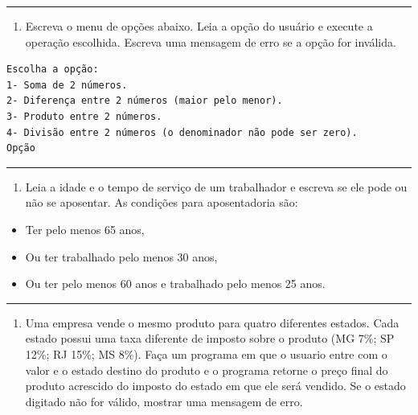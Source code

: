 \documentclass[12pt,a4paper]{article}
\renewcommand{\linethickness}{0.05em}
\providecommand{\tightlist}{%
      \setlength{\itemsep}{0pt}\setlength{\parskip}{0pt}}
\begin{document}
    \begin{center}\rule{0.5\linewidth}{\linethickness}\end{center}

\begin{enumerate}
\def\labelenumi{\arabic{enumi}.}
\setcounter{enumi}{5}
\tightlist
\item
  Escreva o menu de opções abaixo. Leia a opção do usuário e execute a
  operação escolhida. Escreva uma mensagem de erro se a opção for
  inválida.
\end{enumerate}

\begin{verbatim}
Escolha a opção:
1- Soma de 2 números.
2- Diferença entre 2 números (maior pelo menor).
3- Produto entre 2 números.
4- Divisão entre 2 números (o denominador não pode ser zero).
Opção
\end{verbatim}

    \begin{center}\rule{0.5\linewidth}{\linethickness}\end{center}

\begin{enumerate}
\def\labelenumi{\arabic{enumi}.}
\setcounter{enumi}{6}
\tightlist
\item
  Leia a idade e o tempo de serviço de um trabalhador e escreva se ele
  pode ou não se aposentar. As condições para aposentadoria são:
\end{enumerate}

\begin{itemize}
\tightlist
\item
  Ter pelo menos 65 anos,
\item
  Ou ter trabalhado pelo menos 30 anos,
\item
  Ou ter pelo menos 60 anos e trabalhado pelo menos 25 anos.
\end{itemize}

    \begin{center}\rule{0.5\linewidth}{\linethickness}\end{center}

\begin{enumerate}
\def\labelenumi{\arabic{enumi}.}
\setcounter{enumi}{7}
\tightlist
\item
  Uma empresa vende o mesmo produto para quatro diferentes estados. Cada
  estado possui uma taxa diferente de imposto sobre o produto (MG 7\%;
  SP 12\%; RJ 15\%; MS 8\%). Faça um programa em que o usuario entre com
  o valor e o estado destino do produto e o programa retorne o preço
  final do produto acrescido do imposto do estado em que ele será
  vendido. Se o estado digitado não for válido, mostrar uma mensagem de
  erro.
\end{enumerate}
\end{document}
